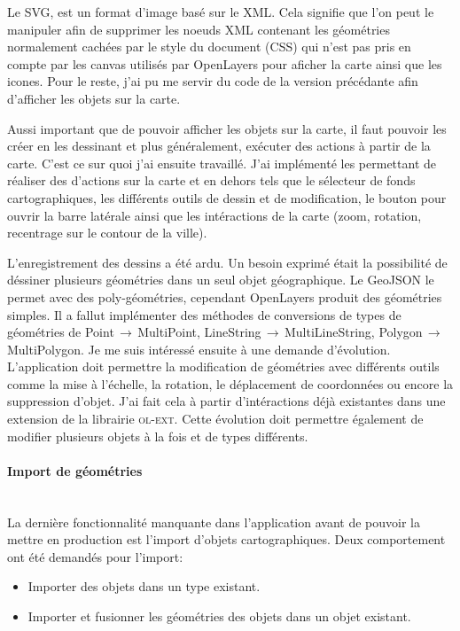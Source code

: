 \documentclass{rapportUHA40}
\begin{document}
Le SVG, est un format d'image basé sur le XML\@. Cela signifie que l'on peut le
manipuler afin de supprimer les noeuds XML contenant les géométries normalement
cachées par le style du document (CSS) qui n'est pas pris en compte par les
canvas utilisés par OpenLayers pour aficher la carte ainsi que les icones. Pour
le reste, j'ai pu me servir du code de la version précédante afin d'afficher
les objets sur la carte.

Aussi important que de pouvoir afficher les objets sur la carte, il faut
pouvoir les créer en les dessinant et plus généralement, exécuter des actions à
partir de la carte. C'est ce sur quoi j'ai ensuite travaillé. J'ai implémenté
les  \fg{} permettant de réaliser des d'actions sur la
carte et en dehors tels que le sélecteur de fonds cartographiques, les
différents outils de dessin et de modification, le bouton pour ouvrir la barre
latérale ainsi que les intéractions de la carte (zoom, rotation, recentrage sur
le contour de la ville).

L'enregistrement des dessins a été ardu. Un besoin exprimé était la possibilité
de déssiner plusieurs géométries dans un seul objet géographique. Le GeoJSON le
permet avec des poly-géométries, cependant OpenLayers produit des géométries
simples. Il a fallut implémenter des méthodes de conversions de types de
géométries de Point$\,\to\,$MultiPoint, LineString$\,\to\,$MultiLineString,
Polygon$\,\to\,$MultiPolygon. Je me suis intéressé ensuite à une demande
d'évolution. L'application doit permettre la modification de géométries avec
différents outils comme la mise à l'échelle, la rotation, le déplacement de
coordonnées ou encore la suppression d'objet. J'ai fait cela à partir
d'intéractions déjà existantes dans une extension de la librairie
\textsc{ol-ext}. Cette évolution doit permettre également de modifier plusieurs
objets à la fois et de types différents.

\paragraph{Import de géométries}\mbox{}\\
La dernière fonctionnalité manquante dans l'application avant de pouvoir la
mettre en production est l'import d'objets cartographiques. Deux comportement
ont été demandés pour l'import:
\begin{itemize}
  \item Importer des objets dans un type existant.
  \item Importer et fusionner les géométries des objets dans un objet existant.
\end{itemize}
\end{document}
